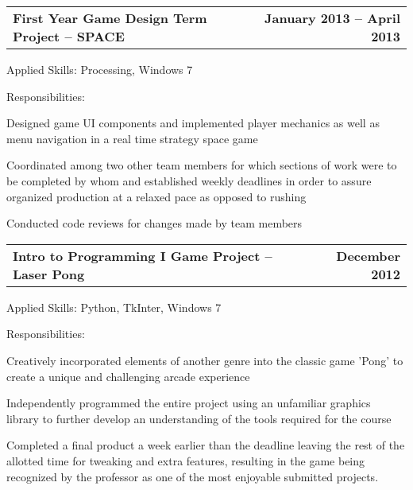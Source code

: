 \documentclass[10pt,letterpaper]{article}
\makeatletter
\newenvironment{indentsection}[1]%
{\begin{list}{}%
  {\setlength{\leftmargin}{#1}}%
  \item[]%
}
{\end{list}}
\newcommand{\headerrow}[2]
{\begin{tabular*}{\linewidth}{l@{\extracolsep{\fill}}r}
  #1 &
  #2 \\
\end{tabular*}}
\makeatother
\begin{document}
\begin{itemize}
  \item
  \headerrow
    {\textbf{First Year Game Design Term Project -- SPACE}}
    {\textbf{January 2013 -- April 2013}}
  \begin{indentsection}{1em}
    \begin{description*}
      \item[Applied Skills:]
      Processing, Windows 7
      \item[Responsibilities:]
      \hfill
      \begin{itemize*}
        \item Designed game UI components and implemented player mechanics as well
        as menu navigation in a real time strategy space game
        \item Coordinated among two other team members for which sections of work
        were to be completed by whom and established weekly deadlines in order to
        assure organized production at a relaxed pace as opposed to rushing
        \item Conducted code reviews for changes made by team members
      \end{itemize*}
    \end{description*}
  \end{indentsection}

  \item
  \headerrow
    {\textbf{Intro to Programming I Game Project -- Laser Pong}}
    {\textbf{December 2012}}
  \begin{indentsection}{1em}
    \begin{description*}
      \item[Applied Skills:]
      Python, TkInter, Windows 7
      \item[Responsibilities:]
      \hfill
      \begin{itemize*}
        \item Creatively incorporated elements of another genre into the classic
        game 'Pong' to create a unique and challenging arcade experience
        \item Independently programmed the entire project using an unfamiliar
        graphics library to further develop an understanding of the tools required
        for the course
        \item Completed a final product a week earlier than the deadline leaving
        the rest of the allotted time for tweaking and extra features, resulting
        in the game being recognized by the professor as one of the most enjoyable
        submitted projects.
      \end{itemize*}
    \end{description*}
  \end{indentsection}

\end{itemize}
\end{document}
